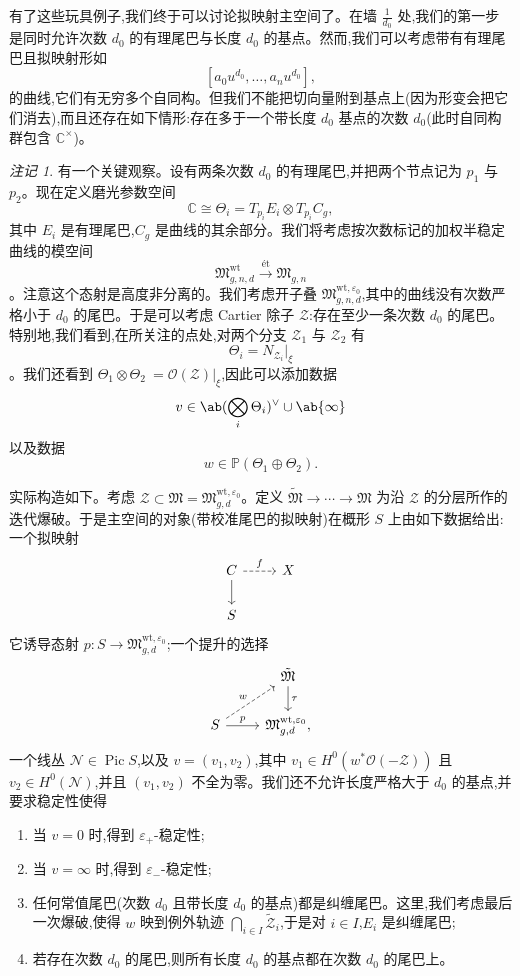 \documentclass{amsart}
\theoremstyle{definition}
\theoremstyle{remark}
\newtheorem{rmk}[thm]{注记}
\theoremstyle{plain}
\theoremstyle{definition}
\theoremstyle{remark}
\newcommand{\C}{\mathbb{C}}
\renewcommand{\P}{\mathbb{P}}
\newcommand{\ep}{\varepsilon}
\newcommand{\mc}[1]{\mathcal{#1}}
\newcommand{\mf}[1]{\mathfrak{#1}}
\newcommand{\mr}[1]{\mathrm{#1}}
\newcommand{\1}{\mathbf{1}}
\newcommand{\2}{\mathbf{2}}
\newcommand{\3}{\mathbf{3}}
\DeclareMathOperator{\Pic}{Pic}
\begin{document}
有了这些玩具例子,我们终于可以讨论拟映射主空间了。在墙 \(\frac{1}{d_0}\) 处,我们的第一步是同时允许次数 \(d_0\) 的有理尾巴与长度 \(d_0\) 的基点。然而,我们可以考虑带有有理尾巴且拟映射形如
\[ [a_0 u^{d_0}, \ldots, a_n u^{d_0}], \]
的曲线,它们有无穷多个自同构。但我们不能把切向量附到基点上(因为形变会把它们消去),而且还存在如下情形:存在多于一个带长度 \(d_0\) 基点的次数 \(d_0\)(此时自同构群包含 \(\C^{\times}\))。

\begin{rmk}
    有一个关键观察。设有两条次数 \(d_0\) 的有理尾巴,并把两个节点记为 \(p_1\) 与 \(p_2\)。现在定义磨光参数空间
    \[ \C \cong \Theta_i = T_{p_i} E_i \otimes T_{p_i} C_g, \]
    其中 \(E_i\) 是有理尾巴,\(C_g\) 是曲线的其余部分。我们将考虑按次数标记的加权半稳定曲线的模空间
    \[ \mf{M}_{g,n,d}^{\mr{wt}} \xrightarrow{\text{\'et}} \mf{M}_{g,n} \]
    。注意这个态射是高度非分离的。我们考虑开子叠 \(\mf{M}_{g,n,d}^{\mr{wt}, \ep_0}\),其中的曲线没有次数严格小于 \(d_0\) 的尾巴。于是可以考虑 Cartier 除子 \(\mc{Z}\):存在至少一条次数 \(d_0\) 的尾巴。特别地,我们看到,在所关注的点处,对两个分支 \(\mc{Z}_1\) 与 \(\mc{Z}_2\) 有
    \[ \Theta_i = N_{\mc{Z}_i} |_{\xi} \]
    。我们还看到 \(\Theta_1 \otimes \Theta_2\ = \mc{O}(\mc{Z})|_{\xi}\),因此可以添加数据
    \[ v \in \ab(\bigotimes_i \Theta_i)^{\vee} \cup \ab\{\infty\} \]
    以及数据
    \[ w \in \P(\Theta_1 \oplus\Theta_2). \]
\end{rmk}

实际构造如下。考虑 \(\mc{Z} \subset \mf{M} = \mf{M}_{g,d}^{\mr{wt}, \ep_0}\)。定义 \(\tilde{\mf{M}} \to \cdots \to \mf{M}\) 为沿 \(\mc{Z}\) 的分层所作的迭代爆破。于是主空间的对象(带校准尾巴的拟映射)在概形 \(S\) 上由如下数据给出:一个拟映射
\begin{equation*}
\begin{tikzcd}
    C \ar{d} \ar[dashrightarrow]{r}{f} & X \\
    S
\end{tikzcd}
\end{equation*}
它诱导态射 \(p \colon S \to \mf{M}_{g,d}^{\mr{wt}, \ep_0}\);一个提升的选择
\begin{equation*}
\begin{tikzcd}
    & \tilde{\mf{M}} \ar{d}{\tau} \\
    S \ar{r}{p} \ar[dashrightarrow]{ur}{w} & \mf{M}_{g,d}^{\mr{wt}, \ep_0},
\end{tikzcd}
\end{equation*}
一个线丛 \(\mc{N} \in \Pic S\),以及 \(v = (v_1, v_2)\),其中 \(v_1 \in H^0(w^* \mc{O}(-\mc{Z}))\) 且 \(v_2 \in H^0(\mc{N})\),并且 \((v_1, v_2)\) 不全为零。我们还不允许长度严格大于 \(d_0\) 的基点,并要求稳定性使得
\begin{enumerate}
    \item 当 \(v = 0\) 时,得到 \(\ep_+\)-稳定性;
    \item 当 \(v = \infty\) 时,得到 \(\ep_-\)-稳定性;
    \item 任何常值尾巴(次数 \(d_0\) 且带长度 \(d_0\) 的基点)都是纠缠尾巴。这里,我们考虑最后一次爆破,使得 \(w\) 映到例外轨迹 \(\bigcap_{i \in I} \tilde{\mc{Z}}_i\),于是对 \(i \in I\),\(E_i\) 是纠缠尾巴;
    \item 若存在次数 \(d_0\) 的尾巴,则所有长度 \(d_0\) 的基点都在次数 \(d_0\) 的尾巴上。
\end{enumerate}
\end{document}
